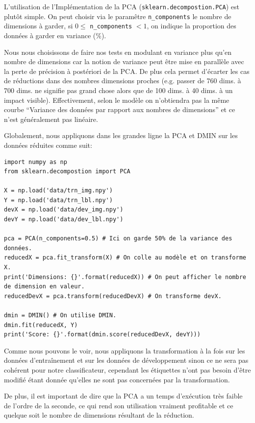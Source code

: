 \documentclass[12pt,a4paper]{article}
\begin{document}
{L'utilisation de l'Implémentation de la PCA (\lstinline[style=default]|sklearn.decompostion.PCA|) est plutôt simple. 
On peut choisir via le paramêtre \lstinline[style=default]|n_components| le nombre de dimensions à garder, \linebreak[4] si $0 \leq$  \lstinline[style=default]|n_components| $< 1$, on indique la proportion des données à garder en variance (\%).

Nous nous choisissons de faire nos tests en modulant en variance plus qu'en nombre de dimensions car la notion de variance peut être mise en parallèle avec la perte de précision à postériori de la PCA.
De plus cela permet d'écarter les cas de réductions dans des nombres dimensions proches (e.g. passer de 760 dims. à 700 dims. ne signifie pas grand chose alors que de 100 dims. à 40 dims. à un impact visible). Effectivement, selon le modèle on n'obtiendra pas la même courbe ``Variance des données par rapport aux nombres de dimensions'' et ce n'est généralement pas linéaire.

Globalement, nous appliquons dans les grandes ligne la PCA et DMIN sur les données réduites comme suit:
\begin{lstlisting}[style=darkula]
import numpy as np
from sklearn.decompostion import PCA

X = np.load('data/trn_img.npy')
Y = np.load('data/trn_lbl.npy')
devX = np.load('data/dev_img.npy')
devY = np.load('data/dev_lbl.npy')

pca = PCA(n_components=0.5) # Ici on garde 50% de la variance des données.
reducedX = pca.fit_transform(X) # On colle au modèle et on transforme X.
print('Dimensions: {}'.format(reducedX)) # On peut afficher le nombre de dimension en valeur.
reducedDevX = pca.transform(reducedDevX) # On transforme devX.

dmin = DMIN() # On utilise DMIN.
dmin.fit(reducedX, Y)
print('Score: {}'.format(dmin.score(reducedDevX, devY)))

\end{lstlisting}

Comme nous pouvons le voir, nous appliquons la transformation à la fois sur les données d'entraînement et sur les données de développement sinon ce ne sera pas cohérent pour notre classificateur, cependant les étiquettes n'ont pas besoin d'être modifié étant donnée qu'elles ne sont pas concernées par la transformation.

De plus, il est important de dire que la PCA a un temps d'exécution très faible de l'ordre de la seconde, ce qui rend son utilisation vraiment profitable et ce quelque soit le nombre de dimensions résultant de la réduction.

}
\end{document}

